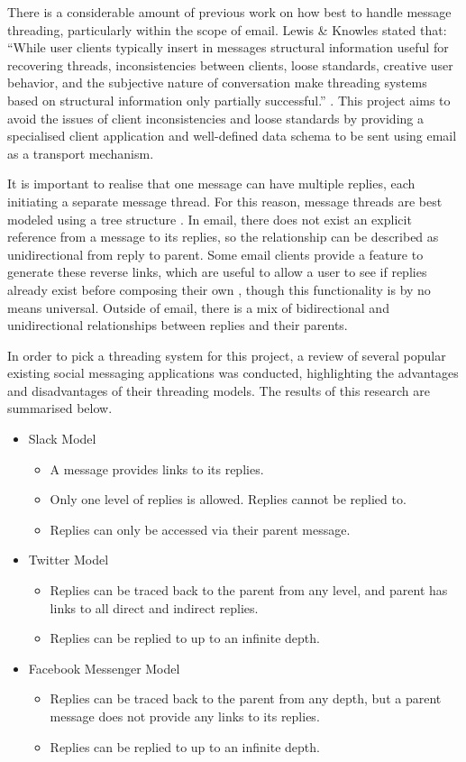 There is a considerable amount of previous work on how best to handle message threading, particularly within the scope of email. Lewis \& Knowles stated that: ``While user clients typically insert in messages structural information useful for recovering threads, inconsistencies between clients, loose standards, creative user behavior, and the subjective nature of conversation make threading systems based on structural information only partially successful.'' \cite{lewis1997threading}. This project aims to avoid the issues of client inconsistencies and loose standards by providing a specialised client application and well-defined data schema to be sent using email as a transport mechanism.

It is important to realise that one message can have multiple replies, each initiating a separate message thread. For this reason, message threads are best modeled using a tree structure \cite{palme1998message}. In email, there does not exist an explicit reference from a message to its replies, so the relationship can be described as unidirectional from reply to parent. Some email clients provide a feature to generate these reverse links, which are useful to allow a user to see if replies already exist before composing their own \cite{palme1998message}, though this functionality is by no means universal. Outside of email, there is a mix of bidirectional and unidirectional relationships between replies and their parents.

In order to pick a threading system for this project, a review of several popular existing social messaging applications was conducted, highlighting the advantages and disadvantages of their threading models. The results of this research are summarised below.

\begin{itemize}
  \item Slack Model
    \begin{itemize}
      \item A message provides links to its replies.
      \item Only one level of replies is allowed. Replies cannot be replied to.
      \item Replies can only be accessed via their parent message.
    \end{itemize}
  \item Twitter Model
    \begin{itemize}
      \item Replies can be traced back to the parent from any level, and parent has links to all direct and indirect replies.
      \item Replies can be replied to up to an infinite depth.
    \end{itemize}
  \item Facebook Messenger Model
    \begin{itemize}
      \item Replies can be traced back to the parent from any depth, but a parent message does not provide any links to its replies.
      \item Replies can be replied to up to an infinite depth.
    \end{itemize}
\end{itemize}

